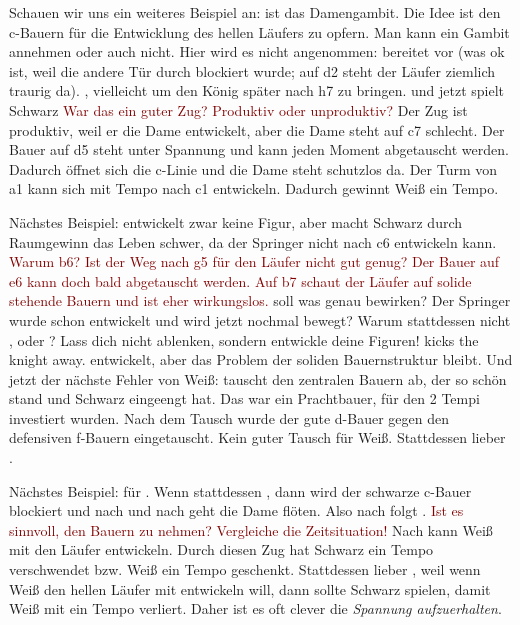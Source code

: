 \documentclass[
  a4paper,
  justified,
  nobib,
]{tufte-handout}
\newcommand\kurznotiz[1]{\textcolor{Maroon}{#1}}
\begin{document}
Schauen wir uns ein weiteres Beispiel an:
\newchessgame
{} ist das Damengambit.
Die Idee ist den c-Bauern für die Entwicklung des hellen Läufers zu opfern.
Man kann ein Gambit annehmen oder auch nicht.
Hier wird es nicht angenommen:
bereitet  vor (was ok ist, weil die andere Tür durch 
blockiert wurde; auf d2 steht der Läufer ziemlich traurig da).
, vielleicht um den König später nach h7 zu bringen.
 und jetzt spielt Schwarz 
\kurznotiz{War das ein guter Zug? Produktiv oder unproduktiv?}
Der Zug ist produktiv, weil er die Dame entwickelt, aber die Dame steht auf c7 schlecht.
Der Bauer auf d5 steht unter Spannung und kann jeden Moment abgetauscht werden.
Dadurch öffnet sich die c-Linie und die Dame steht schutzlos da.
Der Turm von a1 kann sich mit Tempo nach c1 entwickeln.
Dadurch gewinnt Weiß ein Tempo.

Nächstes Beispiel:
\newchessgame
{} entwickelt zwar keine Figur, aber macht Schwarz durch Raumgewinn
das Leben schwer, da der Springer nicht nach c6 entwickeln kann.
\kurznotiz{Warum b6? Ist der Weg nach g5 für den Läufer nicht gut genug? Der Bauer auf e6
kann doch bald abgetauscht werden. Auf b7 schaut der Läufer auf solide stehende Bauern und
ist eher wirkungslos.}
 soll was genau bewirken?
Der Springer wurde schon entwickelt und wird jetzt nochmal bewegt?
Warum stattdessen nicht ,  oder ?
Lass dich nicht ablenken, sondern entwickle deine Figuren!
 kicks the knight away.
 entwickelt, aber das Problem der soliden Bauernstruktur
bleibt.
Und jetzt der nächste Fehler von Weiß:  tauscht den zentralen Bauern
ab, der so schön stand und Schwarz eingeengt hat.
Das war ein Prachtbauer, für den 2 Tempi investiert wurden.
Nach dem Tausch wurde der gute d-Bauer gegen den defensiven f-Bauern eingetauscht.
Kein guter Tausch für Weiß.
Stattdessen lieber .

Nächstes Beispiel:
\newchessgame
{} für .
Wenn stattdessen , dann wird der schwarze c-Bauer blockiert und nach
 und nach  geht die Dame flöten.
Also nach  folgt .
\kurznotiz{Ist es sinnvoll, den Bauern zu nehmen? Vergleiche die Zeitsituation!}
Nach  kann Weiß mit  den Läufer entwickeln.
Durch diesen Zug hat Schwarz ein Tempo verschwendet bzw. Weiß ein Tempo geschenkt.
Stattdessen lieber , weil wenn Weiß den hellen Läufer mit
 entwickeln will, dann sollte Schwarz  spielen,
damit Weiß mit  ein Tempo verliert.
Daher ist es oft clever die \emph{Spannung aufzuerhalten}.
\end{document}
